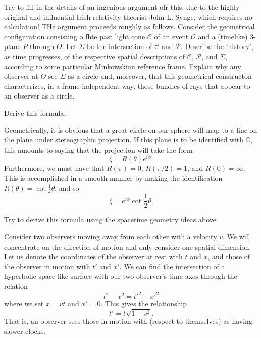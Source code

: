 \documentclass[../road-to-reality.tex]{subfiles}
\begin{document}
\begin{questions}
\question Try to fill in the details of an ingenious argument ofr this, due to the highly original and influential Irish relativity theorist John L. Synge, which requires no calculation! THe argument proceeds roughly as follows. Consider the geometrical configuration consisting o fhte past light cone $\mathcal{C}$ of an event $\mathcal{O}$ and a (timelike) 3-plane $P$ through $O$. Let $\Sigma$ be the intersection of $\mathcal{C}$ and $\mathcal{P}$. Describe the `history', as time progresses, of the respective spatial descriptions of $\mathcal{C}$, $\mathcal{P}$, and $\Sigma$, according to some particular Minkowskian reference frame. Explain why any observer at $O$ see $\Sigma$ as a circle and, moreover, that this geometrical constructon characterizes, in a frame-independent way, those bundles of rays that appear to an observer as a circle.

\question Derive this formula.

  \begin{solution}
    Geometrically, it is obvious that a great circle on our sphere will map to a line on the plane under stereographic projection. If this plane is to be identified with $\mathbb{C}$, this amounts to saying that the projection will take the form
    \[
      \zeta = R(\theta)e^{i\phi}.
    \]
    Furthermore, we must have that $R(\pi) = 0$, $R(\pi/2) = 1$, and $R(0) = \infty$. This is accomplished in a smooth manner by making the identification $R(\theta) = \cot\frac{1}{2}\theta$, and so
    \[
      \zeta = {e^{i\phi}}\cot\frac{1}{2}\theta.
    \]
  \end{solution}

\question Try to derive this formula using the spacetime geometry ideas above.

  \begin{solution}
    Consider two observers moving away from each other with a velocity $v$. We
    will concentrate on the direction of motion and only consider one spatial
    dimension. Let us denote the coordinates of the observer at rest with $t$
    and $x$, and those of the observer in motion with $t'$ and $x'$. We can
    find the intersection of a hyperbolic space-like surface with our two
    observer's time axes through the relation
    \[
      t^2-x^2 = t'^2 - x'^2
    \]
    where we set $x = vt$ and $x' = 0$. This gives the relationship
    \[
      t' = t\sqrt{1 - v^2}.
    \]
    That is, an observer sees those in motion with
    (respect to themselves) as having slower clocks.


\end{solution}
\end{questions}
\end{document}
